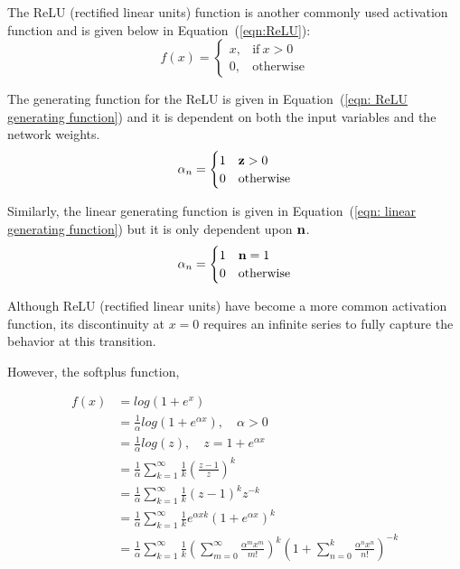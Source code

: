 The ReLU (rectified linear units) function is another commonly used activation function and is given below in Equation~(\ref{eqn:ReLU}):
\begin{equation}
	f(x) =
	\begin{cases}
		x, & \text{if}\ x > 0 \\
		0, & \text{otherwise}
	\end{cases}
	\label{eqn:ReLU}
\end{equation}

The generating function for the ReLU is given in Equation~(\ref{eqn: ReLU generating function}) and it is dependent on both the input variables and the network weights.
\begin{equation}
	\alpha_n =
		\begin{cases}
			1 & \bold z > 0 \\
			0 & \text{otherwise}
		\end{cases}
	\label{eqn: ReLU generating function}
\end{equation}

Similarly, the linear generating function is given in Equation~(\ref{eqn: linear generating function}) but it is only dependent upon $\bold n$.
\begin{equation}
	\alpha_n =
		\begin{cases}
			1 & \bold n = 1 \\
			0 & \text{otherwise}
		\end{cases}
	\label{eqn: linear generating function}
\end{equation}

Although ReLU (rectified linear units) have become a more common activation function, its discontinuity at $x = 0$ requires an infinite series to fully capture the behavior at this transition. 

However, the softplus function,

\begin{align*}
	f(x) & = log(1+e^x)\\
	& = \frac{1}{\alpha}log(1+e^{\alpha x}), \quad \alpha > 0 \\
	& = \frac{1}{\alpha}log(z), \quad z = 1 + e^{\alpha x} \\
	& = \frac{1}{\alpha}\sum\limits_{k=1}^\infty
	\frac{1}{k}\left(\frac{z-1}{z}\right)^k \\
	& = \frac{1}{\alpha}\sum\limits_{k=1}^\infty
	\frac{1}{k}(z-1)^{k} z^{-k} \\
	& = \frac{1}{\alpha}\sum\limits_{k=1}^\infty
	\frac{1}{k} e^{\alpha x k} (1 + e^{\alpha x})^{k} \\
	& = \frac{1}{\alpha}\sum\limits_{k=1}^\infty
	\frac{1}{k} \left(\sum\limits_{m=0}^\infty
	\frac{\alpha^{m} x^{m}}{m!}\right)^k \left(1 + \sum\limits_{n=0}^{k} \frac{\alpha^{n} x^{n}}{n!}\right)^{-k}
\end{align*}

